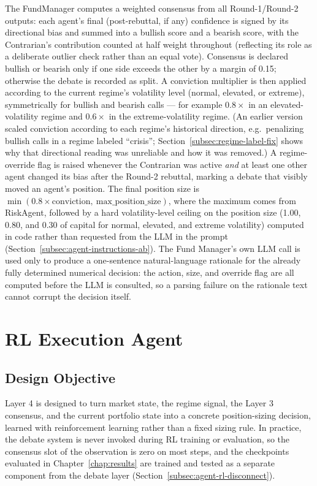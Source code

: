 The FundManager computes a weighted consensus from all Round-1/Round-2 outputs: each agent's final (post-rebuttal, if any) confidence is signed by its directional bias and summed into a bullish score and a bearish score, with the Contrarian's contribution counted at half weight throughout (reflecting its role as a deliberate outlier check rather than an equal vote). Consensus is declared bullish or bearish only if one side exceeds the other by a margin of 0.15; otherwise the debate is recorded as split. A conviction multiplier is then applied according to the current regime's volatility level (normal, elevated, or extreme), symmetrically for bullish and bearish calls --- for example $0.8\times$ in an elevated-volatility regime and $0.6\times$ in the extreme-volatility regime. (An earlier version scaled conviction according to each regime's historical direction, e.g.\ penalizing bullish calls in a regime labeled ``crisis''; Section~\ref{subsec:regime-label-fix} shows why that directional reading was unreliable and how it was removed.) A regime-override flag is raised whenever the Contrarian was active \emph{and} at least one other agent changed its bias after the Round-2 rebuttal, marking a debate that visibly moved an agent's position. The final position size is $\min(0.8 \times \mathrm{conviction},\ \mathrm{max\_position\_size})$, where the maximum comes from RiskAgent, followed by a hard volatility-level ceiling on the position size (1.00, 0.80, and 0.30 of capital for normal, elevated, and extreme volatility) computed in code rather than requested from the LLM in the prompt (Section~\ref{subsec:agent-instructions-ab}). The Fund Manager's own LLM call is used only to produce a one-sentence natural-language rationale for the already fully determined numerical decision: the action, size, and override flag are all computed before the LLM is consulted, so a parsing failure on the rationale text cannot corrupt the decision itself.

\section{RL Execution Agent}
\label{sec:rl-execution-methodology}

\subsection{Design Objective}
\label{subsec:rl-objective}

Layer 4 is designed to turn market state, the regime signal, the Layer 3 consensus, and the current portfolio state into a concrete position-sizing decision, learned with reinforcement learning rather than a fixed sizing rule. In practice, the debate system is never invoked during RL training or evaluation, so the consensus slot of the observation is zero on most steps, and the checkpoints evaluated in Chapter~\ref{chap:results} are trained and tested as a separate component from the debate layer (Section~\ref{subsec:agent-rl-disconnect}).

